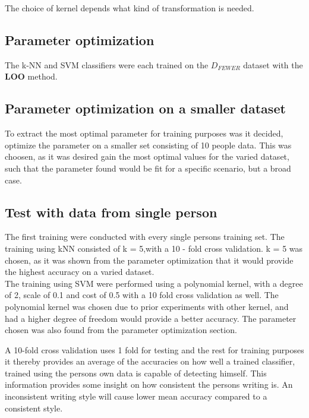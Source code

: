 The choice of kernel depends what kind of transformation is needed. 

\subsection{Parameter optimization}
The k-NN and SVM classifiers were each trained on the \(D_{FEWER}\) dataset with the \textbf{LOO} method.

\subsection{Parameter optimization on a smaller dataset}
To extract the most optimal parameter for training purposes was it decided, optimize the parameter on a smaller set consisting of 10 people data.  This was choosen, as it was desired gain the most optimal values for the varied dataset, such that the parameter found would be fit for a specific scenario, but a broad case. 

\subsection{Test with data from single person}
\label{sec::test_with_data_from_single_person}

The first training were conducted with every single persons training set. The 
training using kNN consisted of k = 5,with a 10 - fold cross validation. k = 5 
was chosen, as it was shown from the parameter optimization that it would provide the highest accuracy on a varied dataset. \\

The training using SVM were performed using a polynomial kernel, with a degree 
of 2, scale of 0.1   and cost of 0.5 with a 10 fold cross validation as well. 
The polynomial kernel was chosen due to prior experiments with other kernel, and 
had a higher degree of freedom would provide a better accuracy. The parameter chosen was also found from the parameter optimization section. 

 
A
10-fold cross validation uses 1 fold for testing and the rest for training 
purposes it thereby provides an average of the accuracies on how well a trained 
classifier, trained using the persons own data is capable of detecting himself.  
This information provides some insight on how consistent the persons writing is. 
An inconsistent writing style will cause lower mean accuracy compared to a 
consistent style. \\

